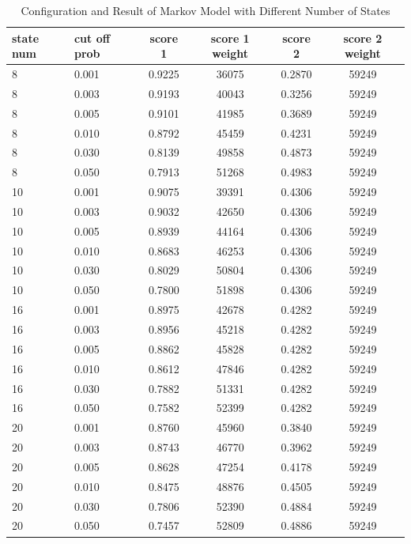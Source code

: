 \documentclass{article}
\begin{document}
\begin{longtable}[htbp]{l|l|*{4}{c}}
    \caption{Configuration and Result of Markov Model with Different Number of States}
    \label{tab:tab1.3.5}\\
    \textbf{state num} & \textbf{cut off prob} & \textbf{score 1} &
    \textbf{score 1 weight} & \textbf{score 2} & \textbf{score 2 weight} \\
    \hline
    8 & 0.001 & 0.9225 & 36075 & 0.2870 & 59249\\
    8 & 0.003 & 0.9193 & 40043 & 0.3256 & 59249\\
    8 & 0.005 & 0.9101 & 41985 & 0.3689 & 59249\\
    8 & 0.010 & 0.8792 & 45459 & 0.4231 & 59249\\
    8 & 0.030 & 0.8139 & 49858 & 0.4873 & 59249\\
    8 & 0.050 & 0.7913 & 51268 & 0.4983 & 59249\\
    10 & 0.001 & 0.9075 & 39391 & 0.4306 & 59249\\
    10 & 0.003 & 0.9032 & 42650 & 0.4306 & 59249\\
    10 & 0.005 & 0.8939 & 44164 & 0.4306 & 59249\\
    10 & 0.010 & 0.8683 & 46253 & 0.4306 & 59249\\
    10 & 0.030 & 0.8029 & 50804 & 0.4306 & 59249\\
    10 & 0.050 & 0.7800 & 51898 & 0.4306 & 59249\\
    16 & 0.001 & 0.8975 & 42678 & 0.4282 & 59249\\
    16 & 0.003 & 0.8956 & 45218 & 0.4282 & 59249\\
    16 & 0.005 & 0.8862 & 45828 & 0.4282 & 59249\\
    16 & 0.010 & 0.8612 & 47846 & 0.4282 & 59249\\
    16 & 0.030 & 0.7882 & 51331 & 0.4282 & 59249\\
    16 & 0.050 & 0.7582 & 52399 & 0.4282 & 59249\\
    20 & 0.001 & 0.8760 & 45960 & 0.3840 & 59249\\
    20 & 0.003 & 0.8743 & 46770 & 0.3962 & 59249\\
    20 & 0.005 & 0.8628 & 47254 & 0.4178 & 59249\\
    20 & 0.010 & 0.8475 & 48876 & 0.4505 & 59249\\
    20 & 0.030 & 0.7806 & 52390 & 0.4884 & 59249\\
    20 & 0.050 & 0.7457 & 52809 & 0.4886 & 59249\\
\end{longtable}
\end{document}
